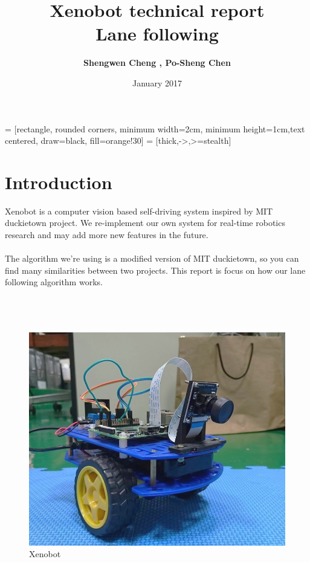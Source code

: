 \documentclass{article}
\title{Xenobot technical report \\  Lane following}
\author{\textbf{Shengwen Cheng , Po-Sheng Chen}}
\date{January 2017}
\begin{document}
\maketitle

 = [rectangle, rounded corners, minimum width=2cm, minimum height=1cm,text centered, draw=black, fill=orange!30]
 = [thick,->,>=stealth]

\section{Introduction}
Xenobot is a computer vision based self-driving system inspired by MIT duckietown project. We re-implement our own system for real-time robotics research and may add more new features in the future.
\\
\\
The algorithm we're using is a modified version of MIT duckietown, so you can find many similarities between two projects. This report is focus on how our lane following algorithm works.
\\
\\
\\
\\

\begin{figure}[ht]
  \label{fig:xenobot}
  \centering
  \includegraphics[scale=0.3]{graphs/xenobot.PNG}
  \caption{Xenobot}
\end{figure}

\clearpage
\end{document}
